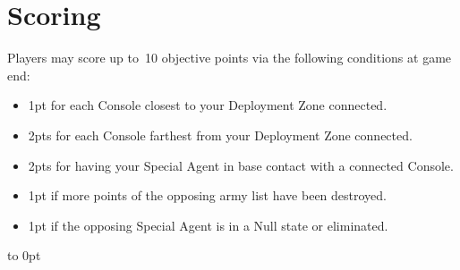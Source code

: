 \section{Scoring}

Players may score up to~10 objective points via the following
conditions at game end:
\begin{itemize}\shortlist
\item 1pt for each Console closest to your Deployment Zone connected.
\item 2pts for each Console farthest from your Deployment Zone
  connected.
\item 2pts for having your Special Agent in base contact with a
  connected Console.
\item 1pt if more points of the opposing army list have been destroyed.
\item 1pt if the opposing Special Agent is in a Null state or eliminated.
\end{itemize}

\vfill
\vbox to 0pt{}
